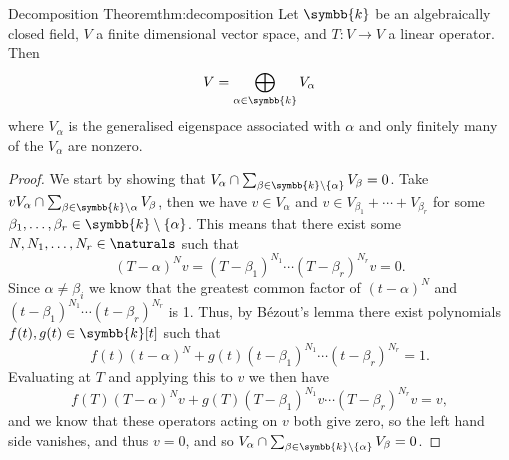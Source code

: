 \documentclass[fleqn]{NotesClass}
\renewcommand{\field}{\symbb{k}}
\begin{document}
    \begin{thm}{Decomposition Theorem}{thm:decomposition}
        Let \(\field\) be an algebraically closed field, \(V\) a finite dimensional vector space, and \(T \colon V \to V\) a linear operator.
        Then
        \begin{equation}
            V = \bigoplus_{\alpha \in \field} V_\alpha 
        \end{equation}
        where \(V_\alpha\) is the generalised eigenspace associated with \(\alpha\) and only finitely many of the \(V_\alpha\) are nonzero.
        \begin{proof}
            We start by showing that \(V_\alpha \cap \sum_{\beta \in \field \setminus \{\alpha\}} V_\beta = 0\).
            Take \(v V_\alpha \cap \sum_{\beta \in \field \setminus \alpha} V_\beta\), then we have \(v \in V_\alpha\) and \(v \in V_{\beta_1} + \dotsb + V_{\beta_r}\) for some \(\beta_1, \dotsc, \beta_r \in \field \setminus \{\alpha\}\).
            This means that there exist some \(N, N_1, \dotsc, N_r \in \naturals\) such that
            \begin{equation}
                (T - \alpha)^Nv = (T - \beta_1)^{N_1} \dotsm (T - \beta_r)^{N_r} v = 0.
            \end{equation}
            Since \(\alpha \ne \beta_i\) we know that the greatest common factor of \((t - \alpha)^N\) and \((t - \beta_1)^{N_1} \dotsm (t - \beta_r)^{N_r}\) is 1.
            Thus, by B\'ezout's lemma there exist polynomials \(f(t), g(t) \in \field[t]\) such that
            \begin{equation}
                f(t)(t - \alpha)^N + g(t)(t - \beta_1)^{N_1} \dotsm (t - \beta_r)^{N_r} = 1.
            \end{equation}
            Evaluating at \(T\) and applying this to \(v\) we then have
            \begin{equation}
                f(T)(T - \alpha)^Nv + g(T)(T - \beta_1)^{N_1}v \dotsm (T - \beta_r)^{N_r}v = v,
            \end{equation}
            and we know that these operators acting on \(v\) both give zero, so the left hand side vanishes, and thus \(v = 0\), and so \(V_\alpha \cap \sum_{\beta \in \field \setminus \{\alpha\}} V_\beta = 0\).
            

\end{proof}
\end{thm}
\end{document}
